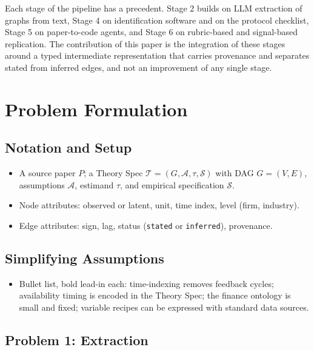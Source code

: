   Each stage of the pipeline has a precedent. Stage 2 builds on LLM extraction
  of graphs from text, Stage 4 on identification software and on the
  protocol checklist, Stage 5 on paper-to-code agents, and Stage 6 on
  rubric-based and signal-based replication. The contribution of this paper is
  the integration of these stages around a typed intermediate representation
  that carries provenance and separates stated from inferred edges, and not
  an improvement of any single stage.

  \section{Problem Formulation}\label{sec:problem}

  \subsection{Notation and Setup}\label{sec:notation_and_setup}

  \begin{itemize}
  \tightlist
  \item
    A source paper \(P\); a Theory Spec
    \(\mathcal{T} = (G, \mathcal{A}, \tau,
    \mathcal{S})\) with DAG \(G = (V, E)\), assumptions \(\mathcal{A}\),
    estimand \(\tau\), and empirical specification \(\mathcal{S}\).
  \item
    Node attributes: observed or latent, unit, time index, level (firm,
    industry).
  \item
    Edge attributes: sign, lag, status (\texttt{stated} or
    \texttt{inferred}), provenance.
  \end{itemize}

  \subsection{Simplifying Assumptions}\label{sec:simplifying_assumptions}

  \begin{itemize}
  \tightlist
  \item
    Bullet list, bold lead-in each: time-indexing removes feedback cycles;
    availability timing is encoded in the Theory Spec; the finance
    ontology is small and fixed; variable recipes can be expressed with
    standard data sources.
  \end{itemize}

  \subsection{Problem 1: Extraction}\label{sec:problem_1_extraction}

